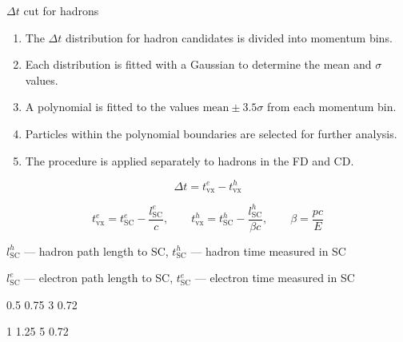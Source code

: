 \begin{frame}{$\Delta t$ cut for hadrons}

    \begin{enumerate}
        \item The $\Delta t$ distribution for hadron candidates is divided
        into momentum bins.
    
        \item Each distribution is fitted with a Gaussian to determine
        the mean and $\sigma$ values.
    
        \item A polynomial is fitted to the values
        $\mathrm{mean} \pm 3.5\sigma$ from each momentum bin.
    
        \item Particles within the polynomial boundaries are selected
        for further analysis.
    
        \item The procedure is applied separately to hadrons in the FD and CD.
    \end{enumerate}
    
    \vspace{0.2cm}
    
    
    \[
        \Delta t =
        t_{\mathrm{vx}}^e
        - t_{\mathrm{vx}}^h
    \]
    
    \[
        t_{\mathrm{vx}}^e =
        t_{\mathrm{SC}}^e - \frac{l_{\mathrm{SC}}^e}{c},
        \qquad
        t_{\mathrm{vx}}^h =
        t_{\mathrm{SC}}^h - \frac{l_{\mathrm{SC}}^h}{\beta c},
        \qquad
        \beta = \frac{pc}{E}
    \]
    
    \vspace{-0.1cm}
    
    \begin{center}
    \small
    $l_{\mathrm{SC}}^h$ — hadron path length to SC,
    $t_{\mathrm{SC}}^h$ — hadron time measured in SC

    $l_{\mathrm{SC}}^e$ — electron path length to SC,
    $t_{\mathrm{SC}}^e$ — electron time measured in SC
    \end{center}
    
\end{frame}

\DeltaTDistributionSlide
    {0.5}
    {0.75}
    {3}
    {0.72}

\DeltaTDistributionSlide
    {1}
    {1.25}
    {5}
    {0.72}

